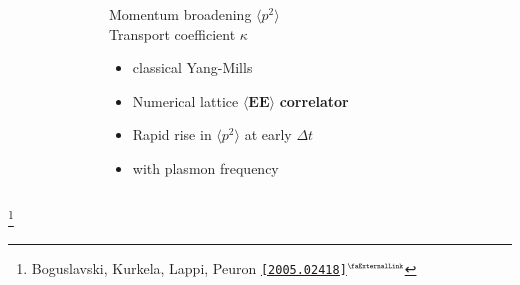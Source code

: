 \documentclass[aspectratio=169,11pt,usenames,dvipsnames]{beamer}
\renewcommand{\thefootnote}{\color{customblue}\faPaperPlaneO}
\newcommand\blfootnote[1]{%
  \begingroup
  \renewcommand\thefootnote{}\footnote{#1}%
  \addtocounter{footnote}{-1}%
  \endgroup
}
\begin{document}
\begin{frame}[t]
\begin{columns}[onlytextwidth,t]
\begin{figure}
        \end{figure}
        \begin{center}
            {\Large\color{palteal} Momentum broadening $\langle p^2 \rangle$ \\[5pt] Transport coefficient $\kappa$ } \\[10pt]
            \footnotesize
                \begin{itemize}
                \item {\footnotesize\color{lightgray}{\bfseries Over-occupied} classical Yang-Mills}
                \item {\footnotesize\color{lightgray}Numerical lattice $\boldsymbol{\langle EE\rangle}$ {\bfseries correlator}}
                \item {\footnotesize\color{lightgray}Rapid rise in $\langle p^2 \rangle$ at early $\Delta t$}
                \item {\footnotesize{} with plasmon frequency}
            \end{itemize}
        \end{center}
    \end{columns}
    \blfootnote{\scriptsize Boguslavski, Kurkela, Lappi, Peuron \href{https://arxiv.org/abs/2005.02418}{\color{palgold}\texttt{[2005.02418]}$^\text{\tiny\faExternalLink}$}}
\end{frame}


\end{document}
